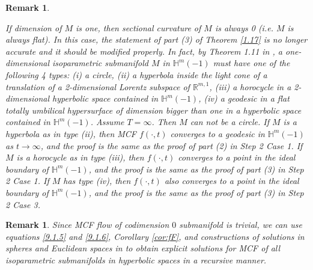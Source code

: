 \documentclass[12pt]{article}
\newtheorem{rmk}[lem]{Remark}
\begin{document}
\begin{rmk} \label{dimension,one}

If dimension of $M$ is one, then sectional curvature of $M$ is always 0 (i.e. $M$ is always flat). In this case, the statement of part (3) of Theorem \ref{1.17} is no longer accurate and it should be modified properly. In fact, by Theorem 1.11 in \cite{B.W}, a one-dimensional isoparametric submanifold $M$ in $\mathbb{H}^m(-1)$ must have one of the following 4 types: (i) a circle, (ii) a hyperbola inside the light cone of a translation of a 2-dimensional Lorentz subspace of $\mathbb{R}^{m, 1}$, (iii) a horocycle in a 2-dimensional hyperbolic space contained in $\mathbb{H}^m(-1)$, (iv) a geodesic in a flat totally umbilical hypersurface of dimension bigger than one in a hyperbolic space contained in $\mathbb{H}^m(-1)$. Assume $T=\infty$. Then $M$ can not be a circle.
If $M$ is a hyperbola as in type (ii), then MCF $f(\cdot, t)$ converges to a geodesic in $\mathbb{H}^m(-1)$  as $t \rightarrow \infty$, and the proof is the same as the proof of part (2) in Step 2 Case 1.
If $M$ is a horocycle as in type (iii), then  $f(\cdot, t)$ converges to a point in the ideal boundary of $\mathbb{H}^m(-1)$,
and the proof is the same as the proof of part (3) in Step 2 Case 1.
If $M$ has type (iv),  then $f(\cdot, t)$ also converges to a point in the ideal boundary of $\mathbb{H}^m(-1)$,
and the proof is the same as the proof of part (3) in Step 2 Case 3.
\end{rmk}
	
\begin{rmk} \label{rem:RecCons}
Since MCF flow of codimension $0$ submanifold is trivial, we can use equations \eqref{9.1.5} and \eqref{9.1.6}, Corollary \ref{cor:fF},
and constructions of solutions in spheres and Euclidean spaces in \cite{X.CT}
to obtain explicit solutions for MCF of all isoparametric submanifolds in hyperbolic spaces in a recursive manner.
\end{rmk}	
\end{document}
